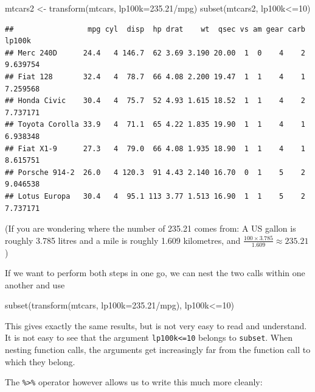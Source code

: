 \documentclass[
]{book}
\newenvironment{Shaded}{\begin{snugshade}}{\end{snugshade}}
\newcommand{\AttributeTok}[1]{\textcolor[rgb]{0.77,0.63,0.00}{#1}}
\newcommand{\DecValTok}[1]{\textcolor[rgb]{0.00,0.00,0.81}{#1}}
\newcommand{\FloatTok}[1]{\textcolor[rgb]{0.00,0.00,0.81}{#1}}
\newcommand{\FunctionTok}[1]{\textcolor[rgb]{0.00,0.00,0.00}{#1}}
\newcommand{\NormalTok}[1]{#1}
\newcommand{\OtherTok}[1]{\textcolor[rgb]{0.56,0.35,0.01}{#1}}
\newcommand{\SpecialCharTok}[1]{\textcolor[rgb]{0.00,0.00,0.00}{#1}}
\begin{document}
\begin{Shaded}
\begin{Highlighting}[]
\NormalTok{mtcars2 }\OtherTok{\textless{}{-}} \FunctionTok{transform}\NormalTok{(mtcars, }\AttributeTok{lp100k=}\FloatTok{235.21}\SpecialCharTok{/}\NormalTok{mpg)}
\FunctionTok{subset}\NormalTok{(mtcars2, lp100k}\SpecialCharTok{\textless{}=}\DecValTok{10}\NormalTok{)}
\end{Highlighting}
\end{Shaded}

\begin{verbatim}
##                 mpg cyl  disp  hp drat    wt  qsec vs am gear carb   lp100k
## Merc 240D      24.4   4 146.7  62 3.69 3.190 20.00  1  0    4    2 9.639754
## Fiat 128       32.4   4  78.7  66 4.08 2.200 19.47  1  1    4    1 7.259568
## Honda Civic    30.4   4  75.7  52 4.93 1.615 18.52  1  1    4    2 7.737171
## Toyota Corolla 33.9   4  71.1  65 4.22 1.835 19.90  1  1    4    1 6.938348
## Fiat X1-9      27.3   4  79.0  66 4.08 1.935 18.90  1  1    4    1 8.615751
## Porsche 914-2  26.0   4 120.3  91 4.43 2.140 16.70  0  1    5    2 9.046538
## Lotus Europa   30.4   4  95.1 113 3.77 1.513 16.90  1  1    5    2 7.737171
\end{verbatim}

(If you are wondering where the number of 235.21 comes from: A US gallon is roughly 3.785 litres and a mile is roughly 1.609 kilometres, and \(\frac{100\times 3.785}{1.609}\approx 235.21\))

If we want to perform both steps in one go, we can nest the two calls within one another and use

\begin{Shaded}
\begin{Highlighting}[]
\FunctionTok{subset}\NormalTok{(}\FunctionTok{transform}\NormalTok{(mtcars, }\AttributeTok{lp100k=}\FloatTok{235.21}\SpecialCharTok{/}\NormalTok{mpg), lp100k}\SpecialCharTok{\textless{}=}\DecValTok{10}\NormalTok{)}
\end{Highlighting}
\end{Shaded}

This gives exactly the same results, but is not very easy to read and understand. It is not easy to see that the argument \texttt{lp100k\textless{}=10} belongs to \texttt{subset}. When nesting function calls, the arguments get increasingly far from the function call to which they belong.

The \texttt{\%\textgreater{}\%} operator however allows us to write this much more cleanly:
\end{document}

